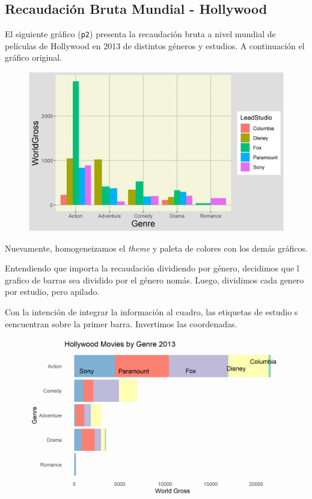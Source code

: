 \documentclass[9pt]{article}
\begin{document}
\subsection*{Recaudaci\'on Bruta Mundial - Hollywood}
El siguiente gr\'afico (\texttt{p2}) presenta la recaudaci\'on bruta a nivel mundial de pel\'iculas de Hollywood en 2013 de distintos g\'eneros y estudios. A continuaci\'on el gr\'afico original.
\begin{figure}[H]
    \centering
    \includegraphics{original1.png}
\end{figure}
Nuevamente, homogeneizamos el \textit{theme} y paleta de colores con los dem\'as gr\'aficos. 

Entendiendo que importa la recaudaci\'on dividiendo por g\'enero, decidimos que l grafico de barras sea dividido por el g\'enero nom\'as. Luego, dividimos cada genero por estudio, pero apilado.

Con la intenci\'on de integrar la informaci\'on al cuadro, las etiquetas de estudio s eencuentran sobre la primer barra. 
Invertimos las coordenadas.
\begin{figure}[H]
    \centering
    \includegraphics{changed1.png}
\end{figure}
\end{document}
